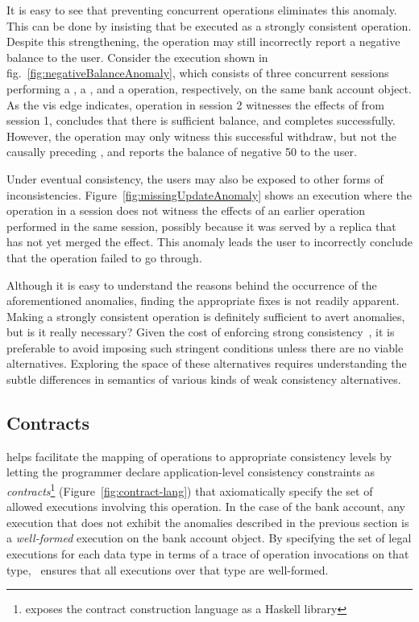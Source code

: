 It is easy to see that preventing concurrent  operations
eliminates this anomaly. This can be done by insisting that  be
executed as a strongly consistent operation. Despite this strengthening,
the  operation may still incorrectly report a negative balance to
the user. Consider the execution shown in
fig.~\ref{fig:negativeBalanceAnomaly}, which consists of three concurrent
sessions performing a , a , and a 
operation, respectively, on the same bank account object. As the {\sf vis} edge
indicates, operation  in session 2 witnesses the effects of
 from session 1, concludes that there is sufficient balance,
and completes successfully. However, the  operation may only
witness this successful withdraw, but not the causally preceding ,
and reports the balance of negative 50 to the user.

Under eventual consistency, the users may also be exposed to other forms of
inconsistencies. Figure~\ref{fig:missingUpdateAnomaly} shows an execution where
the  operation in a session does not witness the effects of an
earlier  operation performed in the same session, possibly because
it was served by a replica that has not yet merged the  effect.
This anomaly leads the user to incorrectly conclude that the 
operation failed to go through.

Although it is easy to understand the reasons behind the occurrence of the
aforementioned anomalies, finding the appropriate fixes is not readily
apparent. Making  a strongly consistent operation is
definitely sufficient to avert anomalies, but is it really necessary? Given
the cost of enforcing strong consistency~\cite{DynamoDB, Pileus}, it is
preferable to avoid imposing such stringent conditions unless there are no
viable alternatives. Exploring the space of these alternatives requires
understanding the subtle differences in semantics of various kinds of weak
consistency alternatives.

\subsection{Contracts}

\name helps facilitate the mapping of operations to appropriate consistency
levels by letting the programmer declare application-level consistency
constraints as \emph{contracts}\footnote{\name exposes the contract
construction language as a Haskell library} (Figure~\ref{fig:contract-lang})
that axiomatically specify the set of allowed executions involving this
operation. In the case of the bank account, any execution that does not exhibit
the anomalies described in the previous section is a \emph{well-formed}
execution on the bank account object. By specifying the set of legal executions
for each data type in terms of a trace of operation invocations on that type,
\name\ ensures that all executions over that type are well-formed.

